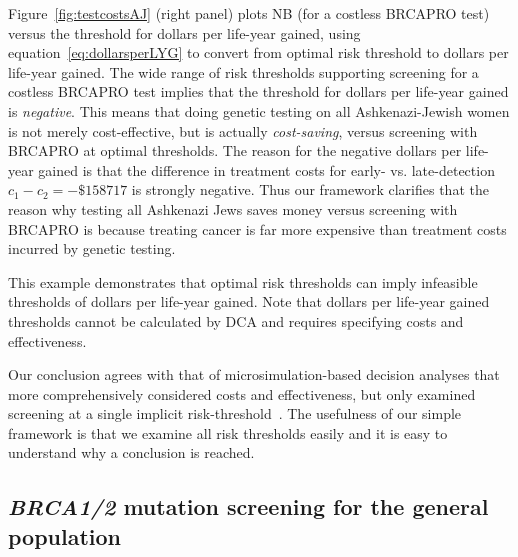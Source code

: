 \documentclass[AMA,STIX1COL]{WileyNJD-v2}
\begin{document}
Figure~\ref{fig:testcostsAJ} (right panel) plots NB (for a costless BRCAPRO test) versus the threshold for dollars per life-year gained, using equation~\ref{eq:dollarsperLYG} to convert from optimal risk threshold to dollars per life-year gained.   The wide range of risk thresholds supporting screening for a costless BRCAPRO test implies that the threshold for dollars per life-year gained is \textit{negative}.  This means that doing genetic testing on all Ashkenazi-Jewish women is not merely cost-effective, but is actually \textit{cost-saving}, versus screening with BRCAPRO at optimal thresholds.  The reason for the negative dollars per life-year gained is that the difference in treatment costs for early- vs. late-detection $c_1-c_2=-\$158717$ is strongly negative.  Thus our framework clarifies that the reason why testing all Ashkenazi Jews saves money versus screening with BRCAPRO is because treating cancer is far more expensive than treatment costs incurred by genetic testing.

This example demonstrates that optimal risk thresholds can imply infeasible thresholds of dollars per life-year gained.  Note that dollars per life-year gained thresholds cannot be calculated by DCA and requires specifying costs and effectiveness.

Our conclusion agrees with that of microsimulation-based decision analyses that more comprehensively considered costs and effectiveness, but only examined screening at a single implicit risk-threshold~\citep{Long2015,Manchanda2015}.  The usefulness of our simple framework is that we examine all risk thresholds easily and it is easy to understand why a conclusion is reached.  






\subsection{\textit{BRCA1/2} mutation screening for the general population}
\label{sec:BRCAgenpop}
\end{document}

